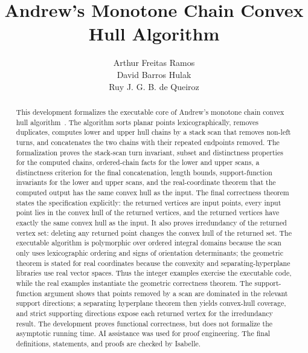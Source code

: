 \documentclass[11pt,a4paper]{article}
\begin{document}
\title{Andrew's Monotone Chain Convex Hull Algorithm}
\author{Arthur Freitas Ramos\\
David Barros Hulak\\
Ruy J. G. B. de Queiroz}
\maketitle

\begin{abstract}
This development formalizes the executable core of Andrew's monotone chain
convex hull algorithm~\cite{Andrew1979}.  The algorithm sorts planar points
lexicographically, removes duplicates, computes lower and upper hull chains by
a stack scan that removes non-left turns, and concatenates the two chains with
their repeated endpoints removed.  The formalization proves the stack-scan
turn invariant, subset and distinctness properties for the computed chains,
ordered-chain facts for the lower and upper scans, a distinctness criterion for
the final concatenation, length bounds, support-function invariants for the
lower and upper scans, and the real-coordinate theorem that the computed output
has the same convex hull as the input.  The final correctness theorem states
the specification explicitly: the returned vertices are input points, every
input point lies in the convex hull of the returned vertices, and the returned
vertices have exactly the same convex hull as the input.  It also proves
irredundancy of the returned vertex set: deleting any returned point changes
the convex hull of the returned set.  The executable algorithm is polymorphic
over ordered integral domains because the scan only uses lexicographic ordering
and signs of orientation determinants; the geometric theorem is stated for real
coordinates because the convexity and separating-hyperplane libraries use real
vector spaces.  Thus the integer examples exercise the executable code, while
the real examples instantiate the geometric correctness theorem.  The
support-function argument shows that points removed by a scan are dominated in
the relevant support directions; a separating hyperplane theorem then yields
convex-hull coverage, and strict supporting directions expose each returned
vertex for the irredundancy result.  The
development proves functional correctness, but does not formalize the
asymptotic running time.  AI assistance was used for proof engineering.  The
final definitions, statements, and proofs are checked by Isabelle.
\end{abstract}

\tableofcontents





\end{document}

